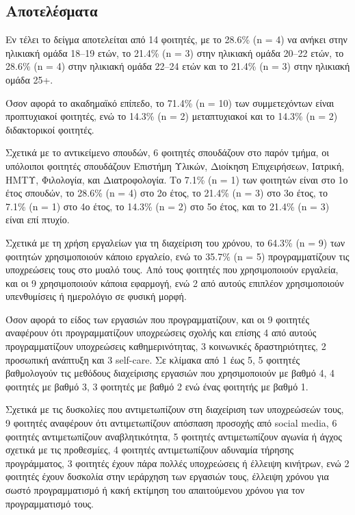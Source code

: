         \subsection{Αποτελέσματα}
            Εν τέλει το δείγμα αποτελείται από 14 φοιτητές, με το 28.6\% (n = 4) να ανήκει στην ηλικιακή ομάδα 18--19 ετών, το 21.4\% (n = 3) στην ηλικιακή ομάδα 20--22 ετών, το 28.6\% (n = 4) στην ηλικιακή ομάδα 22--24 ετών και το 21.4\% (n = 3) στην ηλικιακή ομάδα 25+.

            Όσον αφορά το ακαδημαϊκό επίπεδο, το 71.4\% (n = 10) των συμμετεχόντων είναι προπτυχιακοί φοιτητές, ενώ το 14.3\% (n = 2) μεταπτυχιακοί και το 14.3\% (n = 2) διδακτορικοί φοιτητές.

            Σχετικά με το αντικείμενο σπουδών, 6 φοιτητές σπουδάζουν στο παρόν τμήμα, οι υπόλοιποι φοιτητές σπουδάζουν Επιστήμη Υλικών, Διοίκηση Επιχειρήσεων, Ιατρική, ΗΜΤΥ, Φιλολογία, και Διατροφολογία. Το 7.1\% (n = 1) των φοιτητών είναι στο 1ο έτος σπουδών, το 28.6\% (n = 4) στο 2ο έτος, το 21.4\% (n = 3) στο 3ο έτος, το 7.1\% (n = 1) στο 4ο έτος, το 14.3\% (n = 2) στο 5ο έτος, και το 21.4\% (n = 3) είναι επί πτυχίο.

            Σχετικά με τη χρήση εργαλείων για τη διαχείριση του χρόνου, το 64.3\% (n = 9) των φοιτητών χρησιμοποιούν κάποιο εργαλείο, ενώ το 35.7\% (n = 5) προγραμματίζουν τις υποχρεώσεις τους στο μυαλό τους. Από τους φοιτητές που χρησιμοποιούν εργαλεία, και οι 9 χρησιμοποιούν κάποια εφαρμογή, ενώ 2 από αυτούς επιπλέον χρησιμοποιούν υπενθυμίσεις ή ημερολόγιο σε φυσική μορφή.

            Όσον αφορά το είδος των εργασιών που προγραμματίζουν, και οι 9 φοιτητές αναφέρουν ότι προγραμματίζουν υποχρεώσεις σχολής και επίσης 4 από αυτούς προγραμματίζουν υποχρεώσεις καθημερινότητας, 3 κοινωνικές δραστηριότητες, 2 προσωπική ανάπτυξη και 3 self-care. Σε κλίμακα από 1 έως 5, 5 φοιτητές βαθμολογούν τις μεθόδους διαχείρισης εργασιών που χρησιμοποιούν με βαθμό 4, 4 φοιτητές με βαθμό 3, 3 φοιτητές με βαθμό 2 ενώ ένας φοιτητής με βαθμό 1.

            Σχετικά με τις δυσκολίες που αντιμετωπίζουν στη διαχείριση των υποχρεώσεών τους, 9 φοιτητές αναφέρουν ότι αντιμετωπίζουν απόσπαση προσοχής από social media, 6 φοιτητές αντιμετωπίζουν αναβλητικότητα, 5 φοιτητές αντιμετωπίζουν αγωνία ή άγχος σχετικά με τις προθεσμίες, 4 φοιτητές αντιμετωπίζουν αδυναμία τήρησης προγράμματος, 3 φοιτητές έχουν πάρα πολλές υποχρεώσεις ή έλλειψη κινήτρων, ενώ 2 φοιτητές έχουν δυσκολία στην ιεράρχηση των εργασιών τους, έλλειψη χρόνου για σωστό προγραμματισμό ή κακή εκτίμηση του απαιτούμενου χρόνου για τον προγραμματισμό τους.

